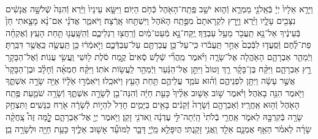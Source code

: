 \documentclass[twoside, openany, parskip=half, 11pt]{book}
\begin{document}
\begin{footnotesize}
\begin{multicols}{2}
\\
וַיֵּרָ֤א אֵלָיו֙ יְיָ֔ בְּֿאֵֽלֹנֵ֖י מַמְרֵ֑א וְֿה֛וּא יֹשֵׁ֥ב פֶּֽתַֽח־הָאֹ֖הֶל כְּֿחֹ֥ם הַיּֽוֹם׃ וַיִּשָּׂ֤א עֵינָיו֙ וַיַּ֔רְא וְֿהִנֵּה֙ שְֿׁלֹשָׁ֣ה אֲנָשִׁ֔ים נִצָּבִ֖ים עָלָ֑יו וַיַּ֗רְא וַיָּ֤רָץ לִקְרָאתָם֙ מִפֶּ֣תַֽח הָאֹ֔הֶל וַיִּשְׁתַּ֖חוּ אָֽרְֿצָה׃ וַיֹּאמַ֑ר אֲדֹנָ֗י אִם־נָ֨א מָצָ֤אתִי חֵן֙ בְּֿעֵינֶ֔יךָ אַל־נָ֥א תַֽעֲבֹ֖ר מֵעַ֥ל עַבְדֶּֽךָ׃
יֻֽקַּח־נָ֣א מְֿעַט־מַ֔יִם וְֿרַֽחֲצ֖וּ רַגְלֵיכֶ֑ם וְֿהִֽשָּֽׁעֲנ֖וּ תַּ֥חַת הָעֵֽץ׃ וְֿאֶקְחָ֨ה פַת־לֶ֜חֶם וְֿסַֽעֲד֤וּ לִבְּֿכֶם֙ אַחַ֣ר תַּֽעֲבֹ֔רוּ כִּֽי־עַל־כֵּ֥ן עֲבַרְתֶּ֖ם עַל־עַבְדְּֿכֶ֑ם וַיֹּ֣אמְֿר֔וּ כֵּ֥ן תַּֽעֲשֶׂ֖ה כַּֽאֲשֶׁ֥ר דִּבַּֽרְתָּ׃
וַיְֿמַהֵ֧ר אַבְרָהָ֛ם הָאֹ֖הֱלָה אֶל־שָׂרָ֑ה וַיֹּ֗אמֶר מַֽהֲרִ֞י שְֿׁלֹ֤שׁ סְֿאִים֙ קֶ֣מַח סֹ֔לֶת ל֖וּשִׁי וַֽעֲשִׂ֥י עֻגֽוֹת׃ וְֿאֶל־הַבָּקָ֖ר רָ֣ץ אַבְרָהָ֑ם וַיִּקַּ֨ח בֶּן־בָּקָ֜ר רַ֤ךְ וָטוֹב֙ וַיִּתֵּ֣ן אֶל־הַנַּ֔עַר וַיְֿמַהֵ֖ר לַֽעֲשׂ֥וֹת אֹתֽוֹ׃ וַיִּקַּ֨ח חֶמְאָ֜ה וְֿחָלָ֗ב וּבֶן־הַבָּקָר֙ אֲשֶׁ֣ר עָשָׂ֔ה וַיִּתֵּ֖ן לִפְנֵיהֶ֑ם וְֿה֨וּא עֹמֵ֧ד עֲלֵיהֶ֛ם תַּ֥חַת הָעֵ֖ץ וַיֹּאכֵֽלוּ׃  וַיֹּאֽמְֿר֣וּ אֵֹלָ֔יֹוֹ אַיֵּ֖ה שָׂרָ֣ה אִשְׁתֶּ֑ךָ וַיֹּ֖אמֶר הִנֵּ֥ה בָאֹֽהֶל׃ וַיֹּ֗אמֶר שׁ֣וֹב אָשׁ֤וּב אֵלֶ֨יךָ֙ כָּעֵ֣ת חַיָּ֔ה וְֿהִנֵּה־בֵ֖ן לְֿשָׂרָ֣ה אִשְׁתֶּ֑ךָ וְֿשָׂרָ֥ה שֹׁמַ֛עַת פֶּ֥תַֽח הָאֹ֖הֶל וְֿה֥וּא אַֽחֲרָֽיו׃ וְֿאַבְרָהָ֤ם וְֿשָׂרָה֙ זְֿקֵנִ֔ים בָּאִ֖ים בַּיָּמִ֑ים חָדַל֙ לִהְי֣וֹת לְֿשָׂרָ֔ה אֹ֖רַח כַּנָּשִֽׁים׃ וַתִּצְחַ֥ק שָׂרָ֖ה בְּֿקִרְבָּ֣הּ לֵאמֹ֑ר אַֽחֲרֵ֤י בְֿלֹתִי֙ הָֽיְֿתָה־לִּ֣י עֶדְנָ֔ה וַֽאדֹנִ֖י זָקֵֽן׃ וַיֹּ֥אמֶר יְיָ֖ אֶל־אַבְרָהָ֑ם לׇׇׇָ֣מָּה זֶּה֩ צָֽחֲקָ֨ה שָׂרָ֜ה לֵאמֹ֗ר הַאַ֥ף אֻמְנָ֛ם אֵלֵ֖ד וַֽאֲנִ֥י זָקַֽנְתִּי׃ הֲיִפָּלֵ֥א מֵֽיְֿיָ֖ דָּבָ֑ר לַמּוֹעֵ֞ד אָשׁ֥וּב אֵלֶ֛יךָ כָּעֵ֥ת חַיָּ֖ה וּלְשָׂרָ֥ה בֵֽן׃


\end{multicols}
\end{footnotesize}
\end{document}
